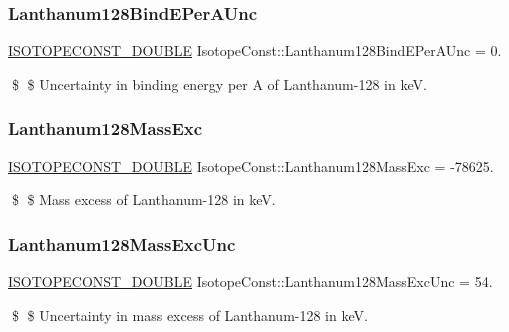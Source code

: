 \subsubsection{\texorpdfstring{Lanthanum128\+Bind\+E\+Per\+A\+Unc}{Lanthanum128BindEPerAUnc}}
{\footnotesize\ttfamily \mbox{\hyperlink{group___isotope_const-_macros_ga8f45a7272ce02c0b4c65c44636ed719a}{I\+S\+O\+T\+O\+P\+E\+C\+O\+N\+S\+T\+\_\+\+D\+O\+U\+B\+LE}} Isotope\+Const\+::\+Lanthanum128\+Bind\+E\+Per\+A\+Unc = 0.}

\$ \$ Uncertainty in binding energy per A of Lanthanum-\/128 in keV. \mbox{\label{group___isotope_const-_lanthanum-_la128_ga094e15d871993767372fb0081e22d4fe}} 
\subsubsection{\texorpdfstring{Lanthanum128\+Mass\+Exc}{Lanthanum128MassExc}}
{\footnotesize\ttfamily \mbox{\hyperlink{group___isotope_const-_macros_ga8f45a7272ce02c0b4c65c44636ed719a}{I\+S\+O\+T\+O\+P\+E\+C\+O\+N\+S\+T\+\_\+\+D\+O\+U\+B\+LE}} Isotope\+Const\+::\+Lanthanum128\+Mass\+Exc = -\/78625.}

\$ \$ Mass excess of Lanthanum-\/128 in keV. \mbox{\label{group___isotope_const-_lanthanum-_la128_ga801610c56eb493ada68abbeb61b73b7d}} 
\subsubsection{\texorpdfstring{Lanthanum128\+Mass\+Exc\+Unc}{Lanthanum128MassExcUnc}}
{\footnotesize\ttfamily \mbox{\hyperlink{group___isotope_const-_macros_ga8f45a7272ce02c0b4c65c44636ed719a}{I\+S\+O\+T\+O\+P\+E\+C\+O\+N\+S\+T\+\_\+\+D\+O\+U\+B\+LE}} Isotope\+Const\+::\+Lanthanum128\+Mass\+Exc\+Unc = 54.}

\$ \$ Uncertainty in mass excess of Lanthanum-\/128 in keV. \mbox{\label{group___isotope_const-_lanthanum-_la128_ga5759e009ce926bce30824cff11426532}} 
